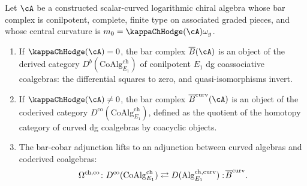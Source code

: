 \begin{proposition}
\label{prop:coderived-vs-derived}
Let\/ $\cA$ be a constructed scalar-curved logarithmic chiral algebra
whose bar complex is conilpotent, complete, finite type on associated
graded pieces, and whose central curvature is
$m_0=\kappaChHodge(\cA)\omega_g$.
\begin{enumerate}[label=\textup{(\roman*)}]
\item If\/ $\kappaChHodge(\cA) = 0$, the bar complex\/
 $\barB(\cA)$ is an object of the derived category\/
 $D^b(\mathrm{CoAlg}_{E_1}^{\mathrm{ch}})$ of conilpotent\/
 $E_1$ dg coassociative coalgebras: the differential squares to zero, and
 quasi-isomorphisms invert.
\item If\/ $\kappaChHodge(\cA) \neq 0$, the bar complex\/
 $\barB^{\mathrm{curv}}(\cA)$ is an object of the coderived
 category\/
 $D^{\mathrm{co}}(\mathrm{CoAlg}_{E_1}^{\mathrm{ch}})$, defined as the
 quotient of the homotopy category of curved dg coalgebras by
 coacyclic objects.
\item The bar-cobar adjunction lifts to an adjunction between
 curved algebras and coderived coalgebras:
 \[
 \Omega^{\mathrm{ch,co}}
 \colon
 D^{\mathrm{co}}(\mathrm{CoAlg}_{E_1}^{\mathrm{ch}})
 \rightleftarrows
 D(\mathrm{Alg}_{E_1}^{\mathrm{ch,curv}})
 :\!
 \overline{B}^{\mathrm{curv}}.
 \]
\end{enumerate}
\end{proposition}

